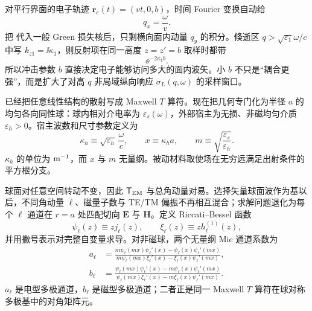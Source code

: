对平行界面的电子轨迹 $\mathbf r_e(t)=(vt,0,b)$，时间 Fourier 变换自动给
\[
q_x=\frac{\omega}{v}.
\]
把 代入一般 Green 损失核后，只剩横向面内动量 $q_y$ 的积分。倏逝区 $q>\sqrt{\varepsilon_1}\omega/c$ 中写 $k_{z1}=\ii\kappa_1$，则反射项在同一高度 $z=z'=b$ 取样时都带
\begin{equation}
\boxed{\ee^{-2\kappa_1b}.}
\label{eq:2d_eels_evanscent_impact_parameter_factor}
\end{equation}
所以冲击参数 $b$ 直接决定电子能够访问多大的面内波矢。小 $b$ 不只是“耦合更强”，而是扩大了对高 $q$ 非局域纵向响应 $\sigma_L(q,\omega)$ 的采样窗口。

\begin{exbox}
 已经把任意线性结构的散射写成 Maxwell $T$ 算符。现在把几何专门化为半径 $a$ 的均匀各向同性球：球内相对介电率为 $\varepsilon_s(\omega)$，外部宿主为无损、非磁均匀介质 $\varepsilon_h>0$。宿主波数和尺寸参数定义为
\begin{equation*}
\kappa_h\equiv \sqrt{\varepsilon_h}\,\frac{\omega}{c},
\qquad
x\equiv \kappa_h a,
\qquad
m\equiv\sqrt{\frac{\varepsilon_s}{\varepsilon_h}}.
\end{equation*}
$\kappa_h$ 的单位为 ${\rm m^{-1}}$，而 $x$ 与 $m$ 无量纲。被动材料取使场在无穷远满足出射条件的平方根分支。

球面对任意空间转动不变，因此 $\mathsf T_{\rm EM}$ 与总角动量对易。选择矢量球面波作为基以后，不同角动量 $\ell$、磁量子数与 TE/TM 偏振不再相互混合；求解问题退化为每个 $\ell$ 通道在 $r=a$ 处匹配切向 $\mathbf E$ 与 $\mathbf H$。定义 Riccati--Bessel 函数
\begin{equation*}
\psi_\ell(z)\equiv z j_\ell(z),
\qquad
\xi_\ell(z)\equiv z h_\ell^{(1)}(z),
\end{equation*}
并用撇号表示对完整自变量求导。对非磁球，两个无量纲 Mie 通道系数为
\begin{align}
 a_\ell
 &=
 \frac{m\psi_\ell(mx)\psi_\ell'(x)
 -\psi_\ell(x)\psi_\ell'(mx)}
 {m\psi_\ell(mx)\xi_\ell'(x)
 -\xi_\ell(x)\psi_\ell'(mx)},
 \label{eq:mie-electric-coefficient-dp75}\\
 b_\ell
 &=
 \frac{\psi_\ell(mx)\psi_\ell'(x)
 -m\psi_\ell(x)\psi_\ell'(mx)}
 {\psi_\ell(mx)\xi_\ell'(x)
 -m\xi_\ell(x)\psi_\ell'(mx)}.
 \label{eq:mie-magnetic-coefficient-dp75}
\end{align}
$a_\ell$ 是电型多极通道，$b_\ell$ 是磁型多极通道；二者正是同一 Maxwell $T$ 算符在球对称多极基中的对角矩阵元。


\end{exbox}
